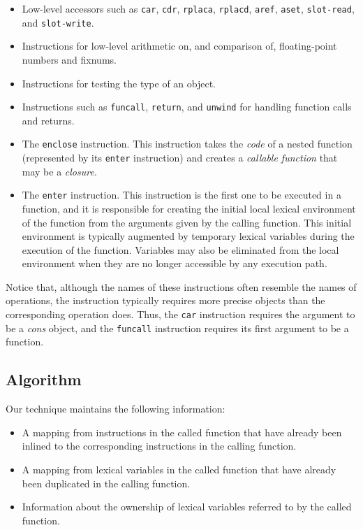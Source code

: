 \begin{itemize}
\item Low-level accessors such as \texttt{car}, \texttt{cdr},
  \texttt{rplaca}, \texttt{rplacd}, \texttt{aref}, \texttt{aset},
  \texttt{slot-read}, and \texttt{slot-write}.
\item Instructions for low-level arithmetic on, and comparison of,
  floating-point numbers and fixnums.
\item Instructions for testing the type of an object.
\item Instructions such as \texttt{funcall}, \texttt{return}, and
  \texttt{unwind} for handling function calls and returns.
\item The \texttt{enclose} instruction.  This instruction takes the
  \emph{code} of a nested function (represented by its \texttt{enter}
  instruction) and creates a \emph{callable function} that may be a
  \emph{closure}.
\item The \texttt{enter} instruction.  This instruction is the first
  one to be executed in a function, and it is responsible for creating
  the initial local lexical environment of the function from the
  arguments given by the calling function.  This initial environment
  is typically augmented by temporary lexical variables during the
  execution of the function.  Variables may also be eliminated from
  the local environment when they are no longer accessible by any
  execution path.
\end{itemize}

Notice that, although the names of these instructions often resemble
the names of \commonlisp{} operations, the instruction typically
requires more precise objects than the corresponding \commonlisp{}
operation does.  Thus, the \texttt{car} instruction requires the
argument to be a \emph{cons} object, and the \texttt{funcall}
instruction requires its first argument to be a function.

\subsection{Algorithm}

Our technique maintains the following information:

\begin{itemize}
\item A mapping from instructions in the called function that have
  already been inlined to the corresponding instructions in the
  calling function.
\item A mapping from lexical variables in the called function that
  have already been duplicated in the calling function.
\item Information about the ownership of lexical variables referred to
  by the called function.
\end{itemize}

